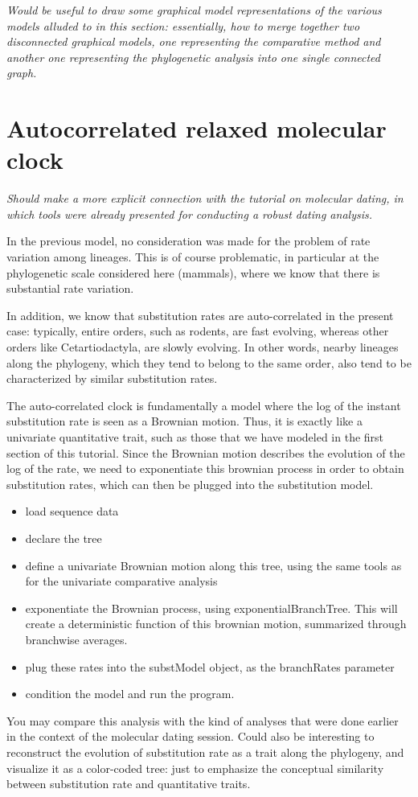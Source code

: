 \documentclass[11pt, oneside]{article}   	%
\begin{document}
\emph{Would be useful to draw some graphical model representations of the various models alluded to in this section: essentially, how to merge together two disconnected graphical models, one representing the comparative method and another one representing the phylogenetic analysis into one single connected graph.}

\section{Autocorrelated relaxed molecular clock}

\emph{
Should make a more explicit connection with 
the tutorial on molecular dating, in which tools were already presented for conducting a robust dating analysis.}

In the previous model, no consideration was made for the problem of rate variation among lineages. This is of course problematic, in particular at the phylogenetic scale considered here (mammals), where we know that there is substantial rate variation. 

In addition, we know that substitution rates are auto-correlated in the present case: typically, entire orders, such as rodents, are fast evolving, whereas other orders like Cetartiodactyla, are slowly evolving. In other words, nearby lineages along the phylogeny, which they tend to belong to the same order, also tend to be characterized by similar substitution rates.


The auto-correlated clock is fundamentally a model where the log of the instant substitution rate is seen as a Brownian motion. Thus, it is exactly like a univariate quantitative trait, such as those that we have modeled in the first section of this tutorial. Since the Brownian motion describes the evolution of the log of the rate, we need to exponentiate this brownian process in order to obtain substitution rates, which can then be plugged into the substitution model.
\begin{itemize}
\item
load sequence data
\item
declare the tree
\item
define a univariate Brownian motion along this tree, using the same tools as for the univariate comparative analysis
\item
exponentiate the Brownian process, using exponentialBranchTree. This will create a deterministic function of this brownian motion, summarized through branchwise averages.
\item
plug these rates into the substModel object, as the branchRates parameter
\item
condition the model and run the program.
\end{itemize}
You may compare this analysis with the kind of analyses that were done earlier in the context of the molecular dating session. Could also be interesting to reconstruct the evolution of substitution rate as a trait along the phylogeny, and visualize it as a color-coded tree: just to emphasize the conceptual similarity between substitution rate and quantitative traits.
\end{document}

